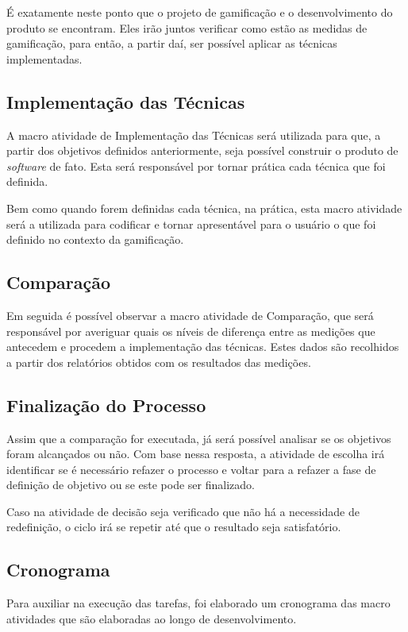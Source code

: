 É exatamente neste ponto que o projeto de gamificação e o desenvolvimento do produto
se encontram. Eles irão juntos verificar como estão as medidas de gamificação, para
então, a partir daí, ser possível aplicar as técnicas implementadas.

\subsection{Implementação das Técnicas}
\label{sub:implematationtechnics}
A macro atividade de Implementação das Técnicas será utilizada para que, a partir
dos objetivos definidos anteriormente, seja possível construir o produto de \textit{software}
de fato. Esta será responsável por tornar prática
cada técnica que foi definida.

Bem como quando forem definidas cada técnica, na prática, esta macro atividade
será a utilizada para codificar e tornar apresentável para o usuário o que
foi definido no contexto da gamificação.

\subsection{Comparação}
\label{sub:Comparacao}
Em seguida é possível observar a macro atividade de Comparação, que será
responsável por averiguar quais os níveis de diferença entre as medições que
antecedem e procedem a implementação das técnicas. Estes dados são recolhidos a
partir dos relatórios obtidos com os resultados das medições.

\subsection{Finalização do Processo}
\label{sub:finalprocess}
Assim que a comparação for executada, já será possível analisar se os objetivos
foram alcançados ou não. Com base nessa resposta, a atividade de escolha irá
identificar se é necessário refazer o processo e voltar para a refazer a fase
de definição de objetivo ou se este pode ser finalizado.

Caso na atividade de decisão seja verificado que não há a necessidade de
redefinição, o ciclo irá se repetir até que o resultado seja satisfatório.

\subsection{Cronograma}
\label{sub:cronograma}
Para auxiliar na execução das tarefas, foi elaborado um cronograma
das macro atividades que são elaboradas ao longo de desenvolvimento.

